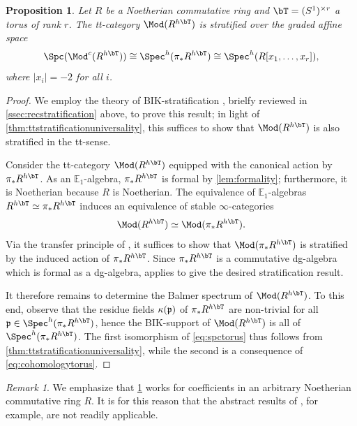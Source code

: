 \documentclass{amsart}%
\numberwithin{equation}{section}%
\newtheorem{Prop}[subsection]{Proposition}
\theoremstyle{remark}
\newtheorem{Rem}[subsection]{Remark}
\begin{document}
\begin{Prop}\label{prop:torusstratification}
Let $R$ be a Noetherian commutative ring and $\bT = (S^{1})^{\times r}$ a torus of rank $r$. The tt-category $\Mod(R^{h\bT})$ is stratified over the graded affine space
\begin{equation}\label{eq:spctorus}
\Spc(\Mod^c(R^{h\bT})) \cong \Spec^h(\pi_*R^{h\bT}) \cong \Spec^h(R[x_1,\ldots,x_r]),
\end{equation}
where $|x_i|=-2$ for all $i$.
\end{Prop}
\begin{proof}
We employ the theory of BIK-stratification \cite{BensonIyengarKrause11b}, brielfy reviewed in \cref{ssec:recstratification} above, to prove this result; in light of \cref{thm:ttstratificationuniversality}, this suffices to show that $\Mod(R^{h\bT})$ is also stratified in the tt-sense. 

Consider the tt-category $\Mod(R^{h\bT})$ equipped with the canonical action by $\pi_*R^{h\bT}$. As an $\mathbb{E}_1$-algebra, $\pi_*R^{h\bT}$ is formal by \cref{lem:formality}; furthermore, it is Noetherian because $R$ is Noetherian. The equivalence of $\mathbb{E}_1$-algebras $R^{h\bT} \simeq \pi_*R^{h\bT}$ induces an equivalence of stable $\infty$-categories
\[
\Mod(R^{h\bT}) \simeq \Mod(\pi_*R^{h\bT}).
\]
Via the transfer principle of \cite[Cor.~8.4]{BensonIyengarKrause11b}, it suffices to show that $\Mod(\pi_*R^{h\bT})$ is stratified by the induced action of $\pi_*R^{h\bT}$. Since $\pi_*R^{h\bT}$ is a commutative dg-algebra which is formal as a dg-algebra, \cite[Thm.~8.1]{BensonIyengarKrause11b} applies to give the desired stratification result. 

It therefore remains to determine the Balmer spectrum of $\Mod(R^{h\bT})$. To this end, observe that the residue fields $\kappa(\frak p)$ of $\pi_*R^{h\bT}$ are non-trivial for all $\frak p \in \Spec^h(\pi_*R^{h\bT})$, hence the BIK-support of $\Mod(R^{h\bT})$ is all of $\Spec^h(\pi_*R^{h\bT})$. The first isomorphism of \eqref{eq:spctorus} thus follows from \cref{thm:ttstratificationuniversality}, while the second is a consequence of \eqref{eq:cohomologytorus}.
\end{proof}

\begin{Rem}
We emphasize that \cref{prop:torusstratification} works for coefficients in an arbitrary Noetherian commutative ring $R$. It is for this reason that the abstract results of \cite{DellAmbrogioStanley16}, for example, are not readily applicable.
\end{Rem}
\end{document}
